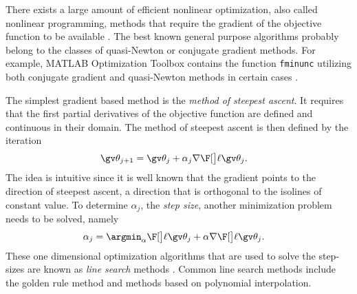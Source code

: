 
There exists a large amount of efficient nonlinear optimization,
also called nonlinear programming, methods that require the gradient of the 
objective function to be available \parencite{luenberger2008}.
The best known general purpose algorithms probably belong to the 
classes of quasi-Newton or conjugate gradient methods. 
For example, MATLAB Optimization Toolbox contains the function
\texttt{fminunc} utilizing both conjugate gradient and 
quasi-Newton methods in certain cases \parencite{fminunc}.

The simplest gradient based method is the \emph{method of steepest ascent}.
It requires that the first partial derivatives of the objective function are defined
and continuous in their domain. The method of steepest ascent is then defined
by the iteration
\begin{align}
	\Th_{j+1}&=\Th_j+\alpha_j\nabla\lLH[\Th_j].
	\label{eq:steepest_descent}
\end{align}
The idea is intuitive since it is well known that the gradient
points to the direction of steepest ascent, a direction
that is orthogonal to the isolines of constant value.
To determine $\alpha_j$, the \emph{step size}, another minimization problem needs to be solved,
namely
\begin{align}
	\alpha_j &= \argmin_\alpha \lLH[\Th_j+\alpha\nabla\lLH[\Th_j]].
	\label{eq:line_search}
\end{align}
These one dimensional optimization algorithms that are used
to solve the step-sizes are known as \emph{line search} methods \parencite{luenberger2008}.
Common line search methods include the golden rule method and 
methods based on polynomial interpolation.

